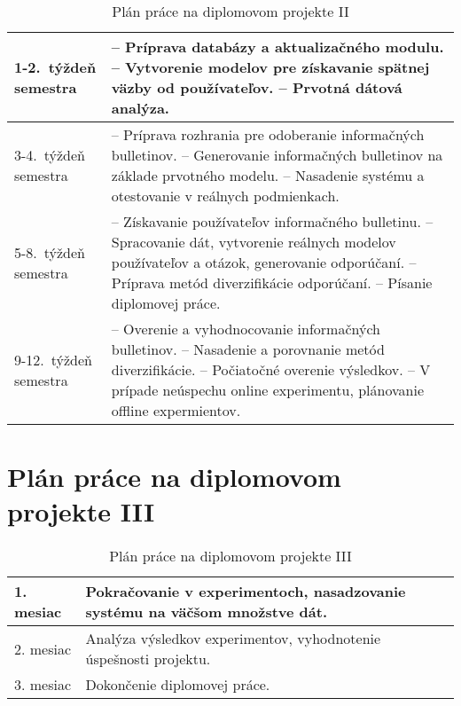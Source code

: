 \begin{table}[h]
\centering
\caption{Plán práce na diplomovom projekte II}
\begin{tabular}{|m{2.3cm}|m{12cm}|}
\hline
1-2.~týždeň semestra   & -- Príprava databázy a aktualizačného modulu.
				\newline -- Vytvorenie modelov pre získavanie spätnej väzby od používateľov.
				\newline -- Prvotná dátová analýza.
				\\ \hline
3-4.~týždeň semestra   & -- Príprava rozhrania pre odoberanie informačných bulletinov.
				\newline -- Generovanie informačných bulletinov na základe prvotného modelu.
				\newline -- Nasadenie systému a otestovanie v reálnych podmienkach.
				\\ \hline
5-8.~týždeň semestra   & -- Získavanie používateľov informačného bulletinu.
				\newline -- Spracovanie dát, vytvorenie reálnych modelov používateľov a otázok, generovanie odporúčaní.
				\newline -- Príprava metód diverzifikácie odporúčaní.
				\newline -- Písanie diplomovej práce.
				\\ \hline
9-12.~týždeň semestra  & -- Overenie a vyhodnocovanie informačných bulletinov.
				\newline -- Nasadenie a porovnanie metód diverzifikácie.
				\newline -- Počiatočné overenie výsledkov.
				\newline -- V prípade neúspechu online experimentu, plánovanie offline expermientov.
				\\ \hline
\end{tabular}
\end{table}

\section{Plán práce na diplomovom projekte III}

\begin{table}[h]
\centering
\caption{Plán práce na diplomovom projekte III}
\begin{tabular}{|m{2.3cm}|m{12cm}|}
\hline
1. mesiac & Pokračovanie v experimentoch, nasadzovanie systému na väčšom množstve dát. \\ \hline
2. mesiac & Analýza výsledkov experimentov, vyhodnotenie úspešnosti projektu. \\ \hline
3. mesiac & Dokončenie diplomovej práce.\\ \hline
\end{tabular}
\end{table}
